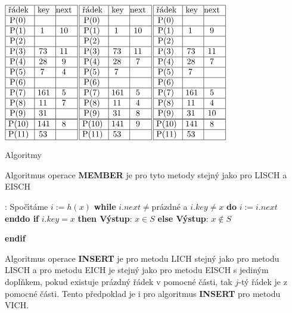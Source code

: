 $\vbox {\hbox{\vtop{\offinterlineskip\halign{\strut\vrule\ # & \vrule\ # & \vrule\hfil # \hfil\vrule\cr\noalign{\hrule}\v r\'adek & key & next \hfil\cr\noalign{\hrule}P(0) & &\hfill \cr\noalign{\hrule}P(1) & 1 & 10 \cr\noalign{\hrule}P(2) & &\hfill \cr\noalign{\hrule}P(3) & 73 & 11 \cr\noalign{\hrule}P(4) & 28 & 9 \cr\noalign{\hrule}P(5) & 7 & 4 \cr\noalign{\hrule}P(6) &  &\hfill \cr\noalign{\hrule}P(7) & 161 & 5 \cr\noalign{\hrule}P(8) & 11 & 7 \cr\noalign{\hrule}P(9) & 31 &\hfill \cr\noalign{\hrule}\noalign{\hrule}P(10) & 141 & 8 \cr\noalign{\hrule}P(11) & 53 & \hfill \cr\noalign{\hrule}}}\,\vtop{\offinterlineskip\halign{\strut\vrule\ # & \vrule\ # & \vrule\hfil# \hfil\vrule\cr\noalign{\hrule}\v r\'adek & key & next \hfil\cr\noalign{\hrule}P(0) & &\hfill \cr\noalign{\hrule}P(1) & 1 & 10 \cr\noalign{\hrule}P(2) & &\hfill \cr\noalign{\hrule}P(3) & 73 & 11 \cr\noalign{\hrule}P(4) & 28 & 7 \cr\noalign{\hrule}P(5) & 7 & \hfill \cr\noalign{\hrule}P(6) &  &\hfill \cr\noalign{\hrule}P(7) & 161 & 5 \cr\noalign{\hrule}P(8) & 11 & 4 \cr\noalign{\hrule}P(9) & 31 & 8 \cr\noalign{\hrule}\noalign{\hrule}P(10) & 141 & 9 \cr\noalign{\hrule}P(11) & 53 & \hfill \cr\noalign{\hrule}}}\,\vtop{\offinterlineskip\halign {\strut\vrule\ # & \vrule\ # & \vrule \hfil # \hfil \vrule\cr\noalign{\hrule}\v r\'adek & key & next \hfil \cr\noalign{\hrule}P(0) & &\hfill \cr\noalign{\hrule}P(1) & 1 & 9 \cr\noalign{\hrule}P(2) & &\hfill \cr\noalign{\hrule}P(3) & 73 & 11 \cr\noalign{\hrule}P(4) & 28 & 7 \cr\noalign{\hrule}P(5) & 7 & \hfill \cr\noalign{\hrule}P(6) & & \hfill \cr\noalign{\hrule}P(7) & 161 & 5 \cr\noalign{\hrule}P(8) & 11 & 4  \cr\noalign{\hrule}P(9) & 31 & 10 \cr\noalign{\hrule}\noalign{\hrule}P(10) & 141 & 8 \cr\noalign{\hrule}P(11) & 53 & \hfill \cr\noalign{\hrule}}}}}$
\medskip

\subhead
Algoritmy
\endsubhead
\smallskip

\flushpar Algoritmus operace {\bf MEMBER} je pro tyto metody 
stejn\'y jako pro LISCH a EISCH
\bigskip

:\newline 
Spo\v c\'\i t\'ame $i:=h(x)$\newline 
{\bf while} $i.next\ne$pr\'azdn\'e a $i.key\ne x$ {\bf do} $i:=i.
next$ {\bf enddo\newline 
if} $i.key=x$ {\bf then V\'ystup}: $x\in S$ {\bf else V\'ystup}: $
x\notin S$ {\bf endif
\medskip

}\flushpar Algoritmus operace {\bf INSERT} je pro metodu LICH stejn\'y 
jako pro metodu LISCH a pro metodu EICH je stejn\'y jako 
pro metodu EISCH s jedin\'ym dopl\v nkem, pokud existuje 
pr\'azdn\'y \v r\'adek v pomocn\'e \v c\'asti, tak $j$-t\'y \v r\'adek je z 
pomocn\'e \v c\'asti. Tento p\v redpoklad je i pro algoritmus 
{\bf INSERT} pro metodu VICH.
\medskip

